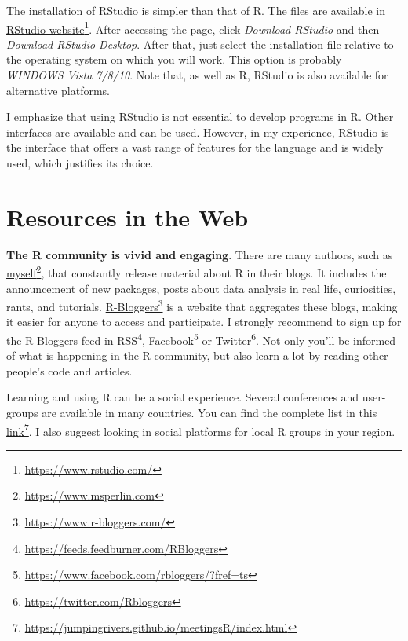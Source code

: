 \documentclass[
  12pt,
]{book}
\begin{document}
The installation of RStudio is simpler than that of R. The files are available in \href{https://www.rstudio.com/}{RStudio website}\footnote{\url{https://www.rstudio.com/}}. After accessing the page, click \emph{Download RStudio} and then \emph{Download RStudio Desktop}. After that, just select the installation file relative to the operating system on which you will work. This option is probably \emph{WINDOWS Vista 7/8/10}. Note that, as well as R, RStudio is also available for alternative platforms.

I emphasize that using RStudio is not essential to develop programs in R. Other interfaces are available and can be used. However, in my experience, RStudio is the interface that offers a vast range of features for the language and is widely used, which justifies its choice.

\hypertarget{resources-in-the-web}{%
\section{Resources in the Web}\label{resources-in-the-web}}

\textbf{The R community is vivid and engaging}. There are many authors, such as \href{https://www.msperlin.com}{myself}\footnote{\url{https://www.msperlin.com}}, that constantly release material about R in their blogs. It includes the announcement of new packages, posts about data analysis in real life, curiosities, rants, and tutorials. \href{https://www.r-bloggers.com/}{R-Bloggers}\footnote{\url{https://www.r-bloggers.com/}} is a website that aggregates these blogs, making it easier for anyone to access and participate. I strongly recommend to sign up for the R-Bloggers feed in \href{https://feeds.feedburner.com/RBloggers}{RSS}\footnote{\url{https://feeds.feedburner.com/RBloggers}}, \href{https://www.facebook.com/rbloggers/?fref=ts}{Facebook}\footnote{\url{https://www.facebook.com/rbloggers/?fref=ts}} or \href{https://twitter.com/Rbloggers}{Twitter}\footnote{\url{https://twitter.com/Rbloggers}}. Not only you'll be informed of what is happening in the R community, but also learn a lot by reading other people's code and articles. 

Learning and using R can be a social experience. Several conferences and user-groups are available in many countries. You can find the complete list in this \href{https://jumpingrivers.github.io/meetingsR/index.html}{link}\footnote{\url{https://jumpingrivers.github.io/meetingsR/index.html}}. I also suggest looking in social platforms for local R groups in your region.
\end{document}
